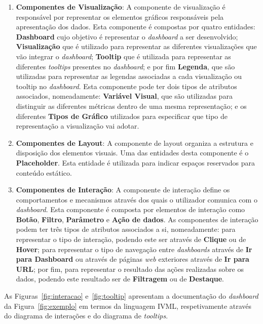 \begin{enumerate} 
  \item \textbf{Componentes de Visualização}: A componente de visualização é responsável por representar os elementos gráficos responsáveis pela apresentação dos dados. Esta componente é compostas por quatro entidades: \textbf{Dashboard} cujo objetivo é representar o \textit{dashboard} a ser desenvolvido; \textbf{Visualização} que é utilizado para representar as diferentes visualizações que vão integrar o \textit{dashboard}; \textbf{Tooltip} que é utilizada para representar as diferentes \textit{tooltips} presentes no \textit{dashboard}; e por fim \textbf{Legenda}, que são utilizadas para representar as legendas associadas a cada visualização ou tooltip no \textit{dashboard}. Esta componente pode ter dois tipos de atributos associados, nomeadamente: \textbf{Variável Visual}, que são utilizadas para distinguir as diferentes métricas dentro de uma mesma representação; e os diferentes \textbf{Tipos de Gráfico} utilizados para especificar que tipo de representação a visualização vai adotar. 
  \item \textbf{Componentes de Layout}: A componente de layout organiza a estrutura e disposição dos elementos visuais. Uma das entidades desta componente é o \textbf{Placeholder}. Esta entidade é utilizada para indicar espaços reservados para conteúdo estático. 
  \item \textbf{Componentes de Interação}: A componente de interação define os comportamentos e mecanismos através dos quais o utilizador comunica com o \textit{dashboard}. Esta componente é composta por elementos de interação como \textbf{Botão}, \textbf{Filtro}, \textbf{Parâmetro} e \textbf{Ação de dados}. As componentes de interação podem ter três tipos de atributos associados a si, nomeadamente: para representar o tipo de interação, podendo este ser através de \textbf{Clique} ou de \textbf{Hover}; para representar o tipo de navegação entre \textit{dashboards} através de \textbf{Ir para Dashboard} ou através de páginas \textit{web} exteriores através de \textbf{Ir para URL}; por fim, para representar o resultado das ações realizadas sobre os dados, podendo este resultado ser de \textbf{Filtragem} ou de \textbf{Destaque}. 
\end{enumerate}

As Figuras~\ref{fig:interacao} e~\ref{fig:tooltip} apresentam a documentação do \textit{dashboard} da Figura~\ref{fig:exemplo} em termos da linguagem \gls{IVML}, respetivamente através do diagrama de interações e do diagrama de \textit{tooltips}.

